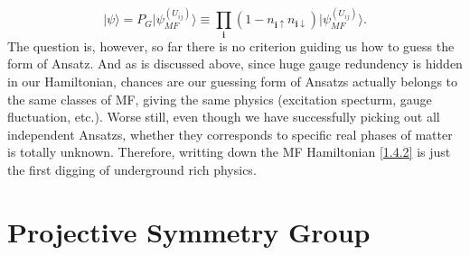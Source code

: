 \documentclass[10pt,nofootinbib]{revtex4}
\begin{document}
	\begin{equation}\label{1.4.3}
			|\psi\rangle=P_G|\psi_{MF}^{(U_{ij})}\rangle\equiv\prod_{\bm{i}}(1-n_{\bm{i}\uparrow}n_{\bm{i}\downarrow})|\psi_{MF}^{(U_{ij})}\rangle.
	\end{equation}
	\indent The question is, however, so far there is no criterion guiding us how to guess the form of Ansatz. And as is discussed above, since huge gauge redundency is hidden in our Hamiltonian, chances are our guessing form of Ansatzs actually belongs to the same classes of MF, giving the same physics (excitation specturm, gauge fluctuation, etc.). Worse still, even though we have successfully picking out all independent Ansatzs, whether they corresponds to specific real phases of matter is totally unknown. Therefore, writting down the MF Hamiltonian \eqref{1.4.2} is just the first digging of underground rich physics. 

\section{Projective Symmetry Group}
\end{document}
